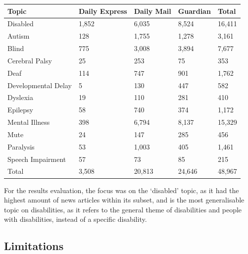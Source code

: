 \documentclass{report}
\begin{document}
\begin{center}
	\begin{tabu} to \textwidth { | X[c] | X[c] | X[c] | X[c] | X[c] | }
		\hline
		Topic & Daily Express & Daily Mail & Guardian & Total \\
		\hline
		Disabled & 1,852 & 6,035 & 8,524 & 16,411  \\
		\hline
		Autism & 128 & 1,755 & 1,278 & 3,161  \\
		\hline
		Blind & 775 & 3,008 & 3,894 & 7,677  \\
		\hline
		Cerebral Palsy & 25 & 253 & 75 & 353  \\
		\hline
		Deaf & 114 & 747 & 901 & 1,762  \\
		\hline
		Developmental Delay & 5 & 130 & 447 & 582  \\
		\hline
		Dyslexia & 19 & 110 & 281 & 410  \\
		\hline
		Epilepsy & 58 & 740 & 374 & 1,172  \\
		\hline
		Mental Illness & 398 & 6,794 & 8,137 & 15,329  \\
		\hline
		Mute & 24 & 147 & 285 & 456  \\
		\hline
		Paralysis & 53 & 1,003 & 405 & 1,461  \\
		\hline
		Speech Impairment & 57 & 73 & 85 & 215  \\
		\hline
		Total & 3,508 & 20,813 & 24,646 & 48,967  \\ 
		\hline
	\end{tabu}
\end{center}

For the results evaluation, the focus was on the `disabled' topic, as it had the highest amount of news articles within its subset, and is the most generalisable topic on disabilities, as it refers to the general theme of disabilities and people with disabilities, instead of a specific disability.

\subsection{Limitations} \label{limitations}
\end{document}
